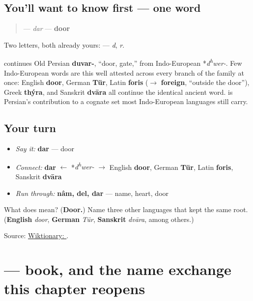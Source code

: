 \subsection*{You'll want to know first — one word}
\begin{quote}
\textbf{} — \emph{dar} — \textbf{door}
\end{quote}

Two letters, both already yours: \textbf{ } — \emph{d}, \emph{r}.

\begin{cousinweb}
\textbf{} continues Old Persian \textbf{duvar-}, \textquotedblleft{}door, gate,\textquotedblright{} from Indo-European *\emph{d\textsuperscript{h}wer-}. Few Indo-European words are this well attested across every branch of the family at once: English \textbf{door}, German \textbf{Tür}, Latin \textbf{foris} ($\to$ \textbf{foreign}, \textquotedblleft{}outside the door\textquotedblright{}), Greek \textbf{thýra}, and Sanskrit \textbf{dvāra} all continue the identical ancient word. \textbf{} is Persian's contribution to a cognate set most Indo-European languages still carry.
\end{cousinweb}

\subsection*{Your turn}
\begin{itemize}
\raggedright
  \item \emph{Say it:} \textbf{dar} — door
  \item \emph{Connect:} \textbf{dar} $\leftarrow$ *\emph{d\textsuperscript{h}wer-} $\to$ English \textbf{door}, German \textbf{Tür}, Latin \textbf{foris}, Sanskrit \textbf{dvāra}
  \item \emph{Run through:} \textbf{nâm, del, dar} — name, heart, door
\end{itemize}

\begin{tcolorbox}[breakable,colback=teal!4,colframe=teal!35!black,title={Before you move on}]
What does \textbf{} mean? (\textbf{Door.}) Name three other languages that kept the same root. (\textbf{English} \emph{door}, \textbf{German} \emph{Tür}, \textbf{Sanskrit} \emph{dvāra}, among others.)

Source: \href{https://en.wiktionary.org/wiki/\%D8\%AF\%D8\%B1}{Wiktionary: }.
\end{tcolorbox}
\section[\texorpdfstring{\fa{کتاب} (ketâb)}{کتاب (ketâb)}]{ — book, and the name exchange this chapter reopens}


